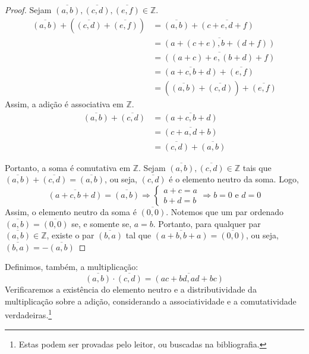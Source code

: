 \begin{proof}
Sejam $\overline{(a,b)},\overline{(c,d)},\overline{(e,f)}\in \mathbb{Z}$.
\begin{align*}
\overline{(a,b)}+\left(\overline{(c,d)}+\overline{(e,f)}\right) &= \overline{(a,b)}+\overline{(c+e,d+f)} \\
&= \overline{(a+(c+e),b+(d+f))} \\
&= \overline{((a+c)+e,(b+d)+f)} \\
&= \overline{(a+c,b+d)}+\overline{(e,f)}\\
&= \left(\overline{(a,b)}+\overline{(c,d)}\right)+\overline{(e,f)}
\end{align*}
Assim, a adição é associativa em $\mathbb{Z}$.
\begin{align*}
\overline{(a,b)}+\overline{(c,d)} &= \overline{(a+c,b+d)}\\
&= \overline{(c+a,d+b)} \\
&= \overline{(c,d)}+\overline{(a,b)}
\end{align*}

Portanto, a soma é comutativa em $\mathbb{Z}$.
Sejam $\overline{(a,b)}, \overline{(c,d)} \in \mathbb{Z}$ tais que $\overline{(a,b)}+\overline{(c,d)}=\overline{(a,b)}$, ou seja, $\overline{(c,d)}$ é o elemento neutro da soma. Logo,
\[\overline{(a+c,b+d)}=\overline{(a,b)} \Rightarrow \begin{cases}
a+c=a\\
b+d=b
\end{cases} \Rightarrow b=0 \textrm{ e } d=0
\]
Assim, o elemento neutro da soma é $\overline{(0,0)}$. Notemos que um par ordenado $\overline{(a,b)}=\overline{(0,0)}$ se, e somente se, $a=b$. Portanto, para qualquer par $\overline{(a,b)} \in \mathbb{Z}$, existe o par $\overline{(b,a)}$ tal que $\overline{(a+b,b+a)}=\overline{(0,0)}$, ou seja, $\overline{(b,a)}=-\overline{(a,b)}$
\end{proof}

Definimos, também, a multiplicação:
\[\overline{(a,b)}\cdot \overline{(c,d)}=\overline{(ac+bd,ad+bc)}\]
Verificaremos a existência do elemento neutro e a distributividade da multiplicação sobre a adição, considerando a associatividade e a comutatividade verdadeiras.\footnote{Estas podem ser provadas pelo leitor, ou buscadas na bibliografia.\cite{impa}}

